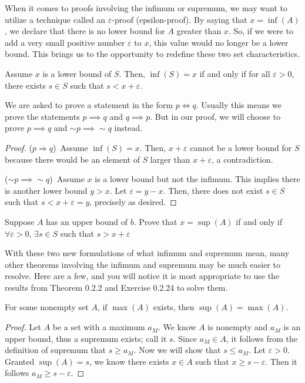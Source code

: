 When it comes to proofs involving the infimum or supremum, we may want to utilize a technique called an $\varepsilon$-proof (epsilon-proof). By saying that $x=\inf(A)$, we declare that there is no lower bound for $A$ greater than $x$. So, if we were to add a very small positive number $\varepsilon$ to $x$, this value would no longer be a lower bound. This brings us to the opportunity to redefine these two set characteristics. \par

\begin{theorem}
    Assume $x$ is a lower bound of $S$. Then, $\inf(S)=x$ if and only if for all $\varepsilon>0$, there exists $s\in S$ such that $s<x+\varepsilon$.
\end{theorem}

We are asked to prove a statement in the form $p\iff q$. Usually this means we prove the statements $p\implies q$ and $q \implies p$. But in our proof, we will choose to prove $p\implies q$ and $\sim p \implies \sim q$ instead. 

\begin{proof}
    ($p\Rightarrow q$)\ Assume $\inf(S)=x$. Then, $x+\varepsilon$ cannot be a lower bound for $S$ because there would be an element of $S$ larger than $x+\varepsilon$, a contradiction.\par
   ($\sim p \implies \sim q$)\ Assume $x$ is a lower bound but not the infimum. This implies there is another lower bound $y>x$. Let $\varepsilon=y-x$. Then, there does not exist $s\in S$ such that $s<x+\varepsilon=y$, precisely as desired. 
\end{proof}

\begin{exercise}
    Suppose $A$ has an upper bound of $b$. Prove that $x=\sup(A)$ if and only if $\forall\varepsilon>0,\, \exists s\in S$ such that $s>x+\varepsilon$
\end{exercise}

With these two new formulations of what infimum and supremum mean, many other theorems involving the infimum and supremum may be much easier to resolve. Here are a few, and you will notice it is most appropriate to use the results from Theorem 0.2.2 and Exercise 0.2.24 to solve them. \par

\begin{theorem}
    For some nonempty set $A$, if $\max(A)$ exists, then $\sup(A)=\max(A)$. 
\end{theorem}
\begin{proof}
    Let $A$ be a set with a maximum $a_M$. We know $A$ is nonempty and $a_M$ is an upper bound, thus a supremum exists; call it $s$. Since $a_M\in A$, it follows from the definition of supremum that $s\geq a_M$. Now we will show that $s\leq a_M$. Let $\varepsilon >0$. Granted $\sup(A)=s$, we know there exists $x\in A$ such that $x\geq s-\varepsilon$. Then it follows $a_M \geq s-\varepsilon$.
\end{proof}

